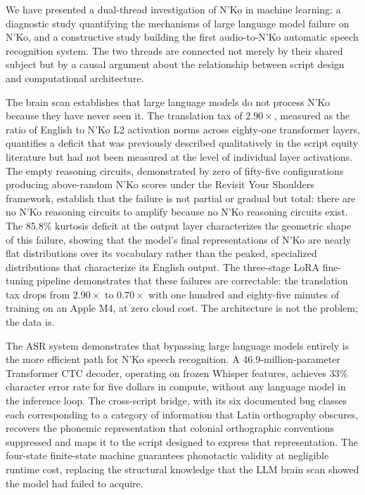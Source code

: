 \documentclass[11pt]{article}
\newcommand{\nko}{N'Ko}
\begin{document}
We have presented a dual-thread investigation of \nko{} in machine learning: a diagnostic study quantifying the mechanisms of large language model failure on \nko{}, and a constructive study building the first audio-to-\nko{} automatic speech recognition system. The two threads are connected not merely by their shared subject but by a causal argument about the relationship between script design and computational architecture.

The brain scan establishes that large language models do not process \nko{} because they have never seen it. The translation tax of $2.90\times$, measured as the ratio of English to \nko{} L2 activation norms across eighty-one transformer layers, quantifies a deficit that was previously described qualitatively in the script equity literature but had not been measured at the level of individual layer activations. The empty reasoning circuits, demonstrated by zero of fifty-five configurations producing above-random \nko{} scores under the Revisit Your Shoulders framework, establish that the failure is not partial or gradual but total: there are no \nko{} reasoning circuits to amplify because no \nko{} reasoning circuits exist. The 85.8\% kurtosis deficit at the output layer characterizes the geometric shape of this failure, showing that the model's final representations of \nko{} are nearly flat distributions over its vocabulary rather than the peaked, specialized distributions that characterize its English output. The three-stage LoRA fine-tuning pipeline demonstrates that these failures are correctable: the translation tax drops from $2.90\times$ to $0.70\times$ with one hundred and eighty-five minutes of training on an Apple M4, at zero cloud cost. The architecture is not the problem; the data is.

The ASR system demonstrates that bypassing large language models entirely is the more efficient path for \nko{} speech recognition. A 46.9-million-parameter Transformer CTC decoder, operating on frozen Whisper features, achieves 33\% character error rate for five dollars in compute, without any language model in the inference loop. The cross-script bridge, with its six documented bug classes each corresponding to a category of information that Latin orthography obscures, recovers the phonemic representation that colonial orthographic conventions suppressed and maps it to the script designed to express that representation. The four-state finite-state machine guarantees phonotactic validity at negligible runtime cost, replacing the structural knowledge that the LLM brain scan showed the model had failed to acquire.
\end{document}
